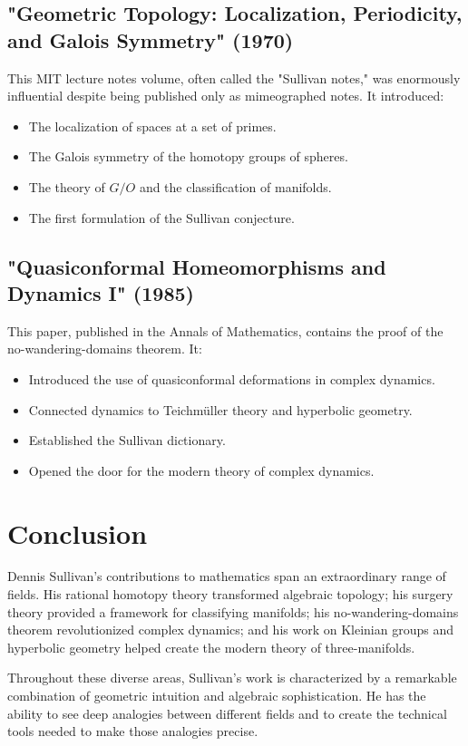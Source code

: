 \subsection{"Geometric Topology: Localization, Periodicity, and Galois Symmetry" (1970)}

This MIT lecture notes volume, often called the "Sullivan notes," was enormously influential despite being published only as mimeographed notes. It introduced:
\begin{itemize}
\item The localization of spaces at a set of primes.
\item The Galois symmetry of the homotopy groups of spheres.
\item The theory of $G/O$ and the classification of manifolds.
\item The first formulation of the Sullivan conjecture.
\end{itemize}

\subsection{"Quasiconformal Homeomorphisms and Dynamics I" (1985)}

This paper, published in the Annals of Mathematics, contains the proof of the no-wandering-domains theorem. It:
\begin{itemize}
\item Introduced the use of quasiconformal deformations in complex dynamics.
\item Connected dynamics to Teichm\"uller theory and hyperbolic geometry.
\item Established the Sullivan dictionary.
\item Opened the door for the modern theory of complex dynamics.
\end{itemize}

\section{Conclusion}

Dennis Sullivan's contributions to mathematics span an extraordinary range of fields. His rational homotopy theory transformed algebraic topology; his surgery theory provided a framework for classifying manifolds; his no-wandering-domains theorem revolutionized complex dynamics; and his work on Kleinian groups and hyperbolic geometry helped create the modern theory of three-manifolds.

Throughout these diverse areas, Sullivan's work is characterized by a remarkable combination of geometric intuition and algebraic sophistication. He has the ability to see deep analogies between different fields and to create the technical tools needed to make those analogies precise.

